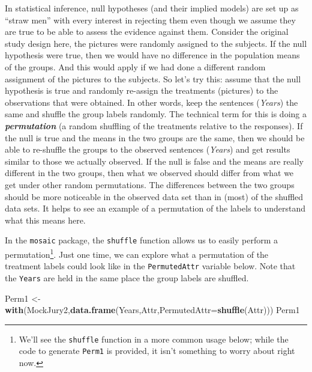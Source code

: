 \documentclass[]{book}
\newenvironment{Shaded}{\begin{snugshade}}{\end{snugshade}}
\newcommand{\KeywordTok}[1]{\textcolor[rgb]{0.13,0.29,0.53}{\textbf{{#1}}}}
\newcommand{\DataTypeTok}[1]{\textcolor[rgb]{0.13,0.29,0.53}{{#1}}}
\newcommand{\StringTok}[1]{\textcolor[rgb]{0.31,0.60,0.02}{{#1}}}
\newcommand{\NormalTok}[1]{{#1}}
\let\rmarkdownfootnote\footnote%
\def\footnote{\protect\rmarkdownfootnote}
\begin{document}
In statistical inference, null hypotheses (and their implied models) are
set up as ``straw men'' with every interest in rejecting them even
though we assume they are true to be able to assess the evidence against
them. Consider the original study design here, the pictures were
randomly assigned to the subjects. If the null hypothesis were true,
then we would have no difference in the population means of the groups.
And this would apply if we had done a different random assignment of the
pictures to the subjects. So let's try this: assume that the null
hypothesis is true and randomly re-assign the treatments (pictures) to
the observations that were obtained. In other words, keep the sentences
(\emph{Years}) the same and shuffle the group labels randomly. The
technical term for this is doing a \textbf{\emph{permutation}} (a random
shuffling of the treatments relative to the responses). If the null is
true and the means in the two groups are the same, then we should be
able to re-shuffle the groups to the observed sentences (\emph{Years})
and get results similar to those we actually observed. If the null is
false and the means are really different in the two groups, then what we
observed should differ from what we get under other random permutations.
The differences between the two groups should be more noticeable in the
observed data set than in (most) of the shuffled data sets. It helps to
see an example of a permutation of the labels to understand what this
means here.

In the \texttt{mosaic} package, the \texttt{shuffle} function allows us
to easily perform a permutation\footnote{We'll see the \texttt{shuffle}
  function in a more common usage below; while the code to generate
  \texttt{Perm1} is provided, it isn't something to worry about right
  now.}. Just one time, we can explore what a permutation of the
treatment labels could look like in the \texttt{PermutedAttr} variable
below. Note that the \texttt{Years} are held in the same place the group
labels are shuffled.

\begin{Shaded}
\begin{Highlighting}[]
\NormalTok{Perm1 <-}\StringTok{ }\KeywordTok{with}\NormalTok{(MockJury2,}\KeywordTok{data.frame}\NormalTok{(Years,Attr,}\DataTypeTok{PermutedAttr=}\KeywordTok{shuffle}\NormalTok{(Attr)))}
\NormalTok{Perm1}
\end{Highlighting}
\end{Shaded}
\end{document}
